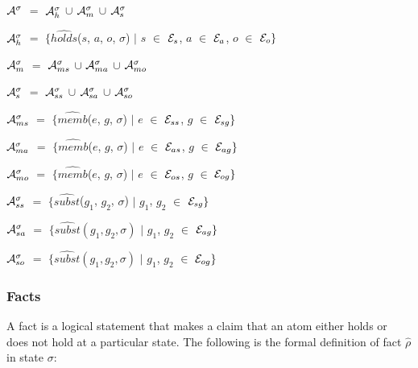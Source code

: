 \documentclass[11pt]{report}
\newenvironment{vquote}
{
  \begin{list}{}{\leftmargin 1em}\item[]
}
{
  \end{list}
}
\begin{document}
          \begin{vquote}
            ${\cal A}^{\sigma}$ $=$
              ${\cal A}^{\sigma}_{h}$ $\cup$
              ${\cal A}^{\sigma}_{m}$ $\cup$
              ${\cal A}^{\sigma}_{s}$

            ${\cal A}^{\sigma}_{h}$ $=$
              $\{\hat{holds}$($s$, $a$, $o$, $\sigma$) $\mid$
                $s$ $\in$ ${\cal E}_{s}$,
                $a$ $\in$ ${\cal E}_{a}$,
                $o$ $\in$ ${\cal E}_{o}\}$

            ${\cal A}^{\sigma}_{m}$ $=$
             ${\cal A}^{\sigma}_{ms}$ $\cup$
             ${\cal A}^{\sigma}_{ma}$ $\cup$
             ${\cal A}^{\sigma}_{mo}$

            ${\cal A}^{\sigma}_{s}$ $=$
              ${\cal A}^{\sigma}_{ss}$ $\cup$
              ${\cal A}^{\sigma}_{sa}$ $\cup$
              ${\cal A}^{\sigma}_{so}$

            ${\cal A}^{\sigma}_{ms}$ $=$
              $\{\hat{memb}$($e$, $g$, $\sigma$) $\mid$
                $e$ $\in$ ${\cal E}_{ss}$,
                $g$ $\in$ ${\cal E}_{sg}\}$

            ${\cal A}^{\sigma}_{ma}$ $=$
              $\{\hat{memb}$($e$, $g$, $\sigma$) $\mid$
                $e$ $\in$ ${\cal E}_{as}$,
                $g$ $\in$ ${\cal E}_{ag}\}$

            ${\cal A}^{\sigma}_{mo}$ $=$
              $\{\hat{memb}$($e$, $g$, $\sigma$) $\mid$
                $e$ $\in$ ${\cal E}_{os}$,
                $g$ $\in$ ${\cal E}_{og}\}$

            ${\cal A}^{\sigma}_{ss}$ $=$
              $\{\hat{subst}$($g_{1}$, $g_{2}$, $\sigma$) $\mid$
                $g_{1}$, $g_{2}$ $\in$ ${\cal E}_{sg}\}$

            ${\cal A}^{\sigma}_{sa}$ $=$
              $\{\hat{subst}(g_{1}, g_{2}, \sigma)$ $\mid$
                $g_{1}$, $g_{2}$ $\in$ ${\cal E}_{ag}\}$

            ${\cal A}^{\sigma}_{so}$ $=$
              $\{\hat{subst}(g_{1}, g_{2}, \sigma)$ $\mid$
                $g_{1}$, $g_{2}$ $\in$ ${\cal E}_{og}\}$
          \end{vquote}

        \subsubsection{Facts}

          A fact is a logical statement that makes a claim that an atom
          either holds or does not hold at a particular state. The
          following is the formal definition of fact $\hat{\rho}$ in
          state $\sigma$:
\end{document}
